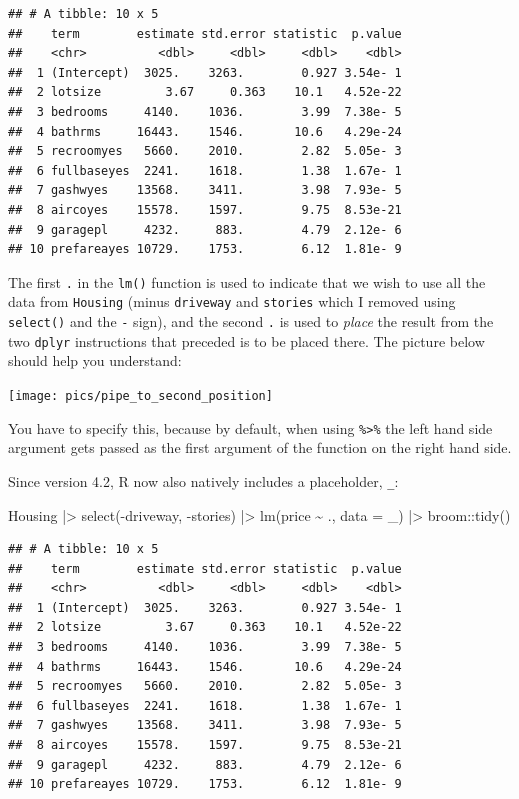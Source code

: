 \documentclass[
]{article}
\newenvironment{Shaded}{\begin{snugshade}}{\end{snugshade}}
\newcommand{\AttributeTok}[1]{\textcolor[rgb]{0.77,0.63,0.00}{#1}}
\newcommand{\FunctionTok}[1]{\textcolor[rgb]{0.00,0.00,0.00}{#1}}
\newcommand{\NormalTok}[1]{#1}
\newcommand{\SpecialCharTok}[1]{\textcolor[rgb]{0.00,0.00,0.00}{#1}}
\begin{document}
\begin{verbatim}
## # A tibble: 10 x 5
##    term        estimate std.error statistic  p.value
##    <chr>          <dbl>     <dbl>     <dbl>    <dbl>
##  1 (Intercept)  3025.    3263.        0.927 3.54e- 1
##  2 lotsize         3.67     0.363    10.1   4.52e-22
##  3 bedrooms     4140.    1036.        3.99  7.38e- 5
##  4 bathrms     16443.    1546.       10.6   4.29e-24
##  5 recroomyes   5660.    2010.        2.82  5.05e- 3
##  6 fullbaseyes  2241.    1618.        1.38  1.67e- 1
##  7 gashwyes    13568.    3411.        3.98  7.93e- 5
##  8 aircoyes    15578.    1597.        9.75  8.53e-21
##  9 garagepl     4232.     883.        4.79  2.12e- 6
## 10 prefareayes 10729.    1753.        6.12  1.81e- 9
\end{verbatim}

The first \texttt{.} in the \texttt{lm()} function is used to indicate that we wish to use all the data from \texttt{Housing}
(minus \texttt{driveway} and \texttt{stories} which I removed using \texttt{select()} and the \texttt{-} sign), and the second \texttt{.} is
used to \emph{place} the result from the two \texttt{dplyr} instructions that preceded is to be placed there.
The picture below should help you understand:

\texttt{[image: pics/pipe\_to\_second\_position]}

You have to specify this, because by default, when using \texttt{\%\textgreater{}\%} the left hand side argument gets
passed as the first argument of the function on the right hand side.

Since version 4.2, R now also natively includes a placeholder, \texttt{\_}:

\begin{Shaded}
\begin{Highlighting}[]
\NormalTok{Housing }\SpecialCharTok{|\textgreater{}}
  \FunctionTok{select}\NormalTok{(}\SpecialCharTok{{-}}\NormalTok{driveway, }\SpecialCharTok{{-}}\NormalTok{stories) }\SpecialCharTok{|\textgreater{}}
  \FunctionTok{lm}\NormalTok{(price }\SpecialCharTok{\textasciitilde{}}\NormalTok{ ., }\AttributeTok{data =}\NormalTok{ \_) }\SpecialCharTok{|\textgreater{}}
\NormalTok{  broom}\SpecialCharTok{::}\FunctionTok{tidy}\NormalTok{()}
\end{Highlighting}
\end{Shaded}

\begin{verbatim}
## # A tibble: 10 x 5
##    term        estimate std.error statistic  p.value
##    <chr>          <dbl>     <dbl>     <dbl>    <dbl>
##  1 (Intercept)  3025.    3263.        0.927 3.54e- 1
##  2 lotsize         3.67     0.363    10.1   4.52e-22
##  3 bedrooms     4140.    1036.        3.99  7.38e- 5
##  4 bathrms     16443.    1546.       10.6   4.29e-24
##  5 recroomyes   5660.    2010.        2.82  5.05e- 3
##  6 fullbaseyes  2241.    1618.        1.38  1.67e- 1
##  7 gashwyes    13568.    3411.        3.98  7.93e- 5
##  8 aircoyes    15578.    1597.        9.75  8.53e-21
##  9 garagepl     4232.     883.        4.79  2.12e- 6
## 10 prefareayes 10729.    1753.        6.12  1.81e- 9
\end{verbatim}
\end{document}
